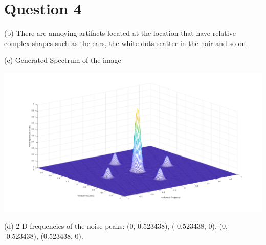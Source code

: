 \documentclass{article}
\begin{document}
\section*{Question 4}

(b) There are annoying artifacts located at the location that have relative complex shapes such as the ears, the white dots scatter in the hair and so on.

(c) Generated Spectrum of the image

\includegraphics[width=\textwidth]{q4.png}

(d) 2-D frequencies of the noise peaks: (0, 0.523438), (-0.523438, 0), (0, -0.523438), (0.523438, 0).
\end{document}
